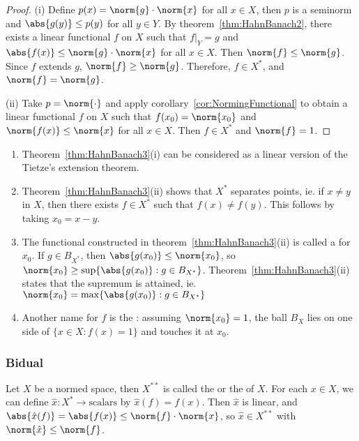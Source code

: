 \documentclass[a4paper]{article}
\begin{document}
\begin{proof}
  (i) Define $p(x)=\norm{g}\cdot\norm{x}$ for all $x\in X$, then $p$ is a seminorm and $\abs{g(y)}\leq p(y)$ for all $y\in Y$. By theorem~\ref{thm:HahnBanach2}, there exists a linear functional $f$ on $X$ such that $f|_Y=g$ and $\abs{f(x)}\leq\norm{g}\cdot\norm{x}$ for all $x\in X$. Then $\norm{f}\leq\norm{g}$. Since $f$ extends $g$, $\norm{f}\geq\norm{g}$. Therefore, $f\in X^*$, and $\norm{f}=\norm{g}$.

  (ii) Take $p=\norm{\cdot}$ and apply corollary~\ref{cor:NormingFunctional} to obtain a linear functional $f$ on $X$ such that $f(x_0)=\norm{x_0}$ and $\norm{f(x)}\leq\norm{x}$ for all $x\in X$. Then $f\in X^*$ and $\norm{f}=1$.
\end{proof}

\begin{remark}
  \begin{enumerate}[label=(\arabic*)]
    \item Theorem~\ref{thm:HahnBanach3}(i) can be considered as a linear version of the Tietze's extension theorem.
    \item Theorem~\ref{thm:HahnBanach3}(ii) shows that $X^*$ separates points, ie. if $x\not= y$ in $X$, then there exists $f\in X^*$ such that $f(x)\not= f(y)$. This follows by taking $x_0=x-y$.
    \item The functional constructed in theorem~\ref{thm:HahnBanach3}(ii) is called a  for $x_0$. If $g\in B_{X^*}$, then $\abs{g(x_0)}\leq\norm{x_0}$, so $\norm{x_0}\geq\sup\{\abs{g(x_0)}:g\in B_{X^*}\}$. Theorem~\ref{thm:HahnBanach3}(ii) states that the supremum is attained, ie. $\norm{x_0}=\max\{\abs{g(x_0)}:g\in B_{X^*}\}$
    \item Another name for $f$ is the : assuming $\norm{x_0}=1$, the ball $B_X$ lies on one side of $\{x\in X:f(x)=1\}$ and touches it at $x_0$.
  \end{enumerate}
\end{remark}

\subsubsection*{Bidual}
Let $X$ be a normed space, then $X^{**}$ is called the  or the  of $X$. For each $x\in X$, we can define $\hat{x}:X^*\to\mathrm{scalars}$ by $\hat{x}(f)=f(x)$. Then $\hat{x}$ is linear, and $\abs{\hat{x}(f)}=\abs{f(x)}\leq\norm{f}\cdot\norm{x}$, so $\hat{x}\in X^{**}$ with $\norm{\hat{x}}\leq\norm{f}$.
\end{document}
